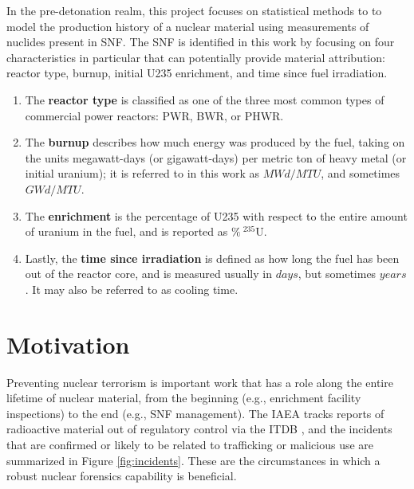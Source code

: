 In the pre-detonation realm, this project focuses on statistical methods to to
model the production history of a nuclear material using measurements of
nuclides present in \gls{SNF}.  The \gls{SNF} is identified in this work by
focusing on four characteristics in particular that can potentially provide
material attribution: reactor type, burnup, initial \gls{U235} enrichment, and
time since fuel irradiation. 
\begin{enumerate}
  \item The \textbf{reactor type} is classified as one of the three most common
        types of commercial power reactors: \gls{PWR}, \gls{BWR}, or \gls{PHWR}.
  \item The \textbf{burnup} describes how much energy was produced by the fuel,
        taking on the units megawatt-days (or gigawatt-days) per metric 
        ton of heavy metal (or initial uranium); it is referred to in this work 
        as $MWd/MTU$, and sometimes $GWd/MTU$.  
  \item The \textbf{enrichment} is the percentage of \gls{U235} with respect to
        the entire amount of uranium in the fuel, and is reported as 
        $\%\:{}^{235}\text{U}$. 
  \item Lastly, the \textbf{time since irradiation} is defined as how long the
        fuel has been out of the reactor core, and is measured usually in $days$,
        but sometimes $years$. It may also be referred to as cooling time. 
\end{enumerate}

\section{Motivation}
\label{sec:motivation}

Preventing nuclear terrorism is important work that has a role along the entire
lifetime of nuclear material, from the beginning (e.g., enrichment facility
inspections) to the end (e.g., \gls{SNF} management). The \gls{IAEA} tracks
reports of radioactive material out of regulatory control via the \gls{ITDB}
\cite{itdb}, and the incidents that are confirmed or likely to be related to
trafficking or malicious use are summarized in Figure \ref{fig:incidents}.
These are the circumstances in which a robust nuclear forensics capability is
beneficial.

